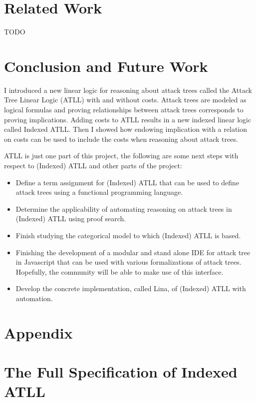 \documentclass{llncs}
\begin{document}
\section{Related Work}
\label{sec:related_work}
TODO


\section{Conclusion and Future Work}
\label{sec:conclusion}
I introduced a new linear logic for reasoning about attack trees
called the Attack Tree Linear Logic (ATLL) with and without costs.
Attack trees are modeled as logical formulas and proving relationships
between attack trees corresponds to proving implications.  Adding
costs to ATLL results in a new indexed linear logic called Indexed
ATLL.  Then I showed how endowing implication with a relation on costs
can be used to include the costs when reasoning about attack trees.

ATLL is just one part of this project, the following are some next
steps with respect to (Indexed) ATLL and other parts of the project:
\begin{itemize}
\item Define a term assignment for (Indexed) ATLL that can be used to
  define attack trees using a functional programming language.
\item Determine the applicability of automating reasoning on attack
  trees in (Indexed) ATLL using proof search.  
\item Finish studying the categorical model to which (Indexed) ATLL is
  based.
\item Finishing the development of a modular and stand alone IDE for
  attack tree in Javascript that can be used with various
  formalizations of attack trees.  Hopefully, the community will
  be able to make use of this interface.
\item Develop the concrete implementation, called Lina, of (Indexed)
  ATLL with automation.
\end{itemize}





\appendix

\section*{Appendix}
\label{sec:appendix}

\section{The Full Specification of Indexed ATLL}
\label{subsec:the_full_specification_of_indexed_atll}


\end{document}
